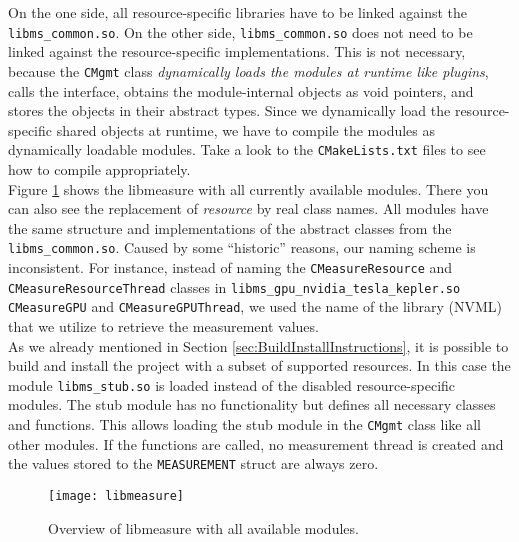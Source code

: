 On the one side, all resource-specific libraries have to be linked against the \texttt{libms\_common.so}. On the other side, \texttt{libms\_common.so} does not need to be linked against the resource-specific implementations. This is not necessary, because the \texttt{CMgmt} class \textit{dynamically loads the modules at runtime like plugins}, calls the interface, obtains the module-internal objects as void pointers, and stores the objects in their abstract types. Since we dynamically load the resource-specific shared objects at runtime, we have to compile the modules as dynamically loadable modules. Take a look to the \texttt{CMakeLists.txt} files to see how to compile appropriately.\\

Figure \ref{fig:libmeasure_overview} shows the libmeasure with all currently available modules. There you can also see the replacement of \textit{resource} by real class names. All modules have the same structure and implementations of the abstract classes from the \texttt{libms\_common.so}. Caused by some ``historic'' reasons, our naming scheme is inconsistent. For instance, instead of naming the \texttt{CMeasureResource} and \texttt{CMeasureResourceThread} classes in \texttt{libms\_gpu\_nvidia\_tesla\_kepler.so} \\\texttt{CMeasureGPU} and \texttt{CMeasureGPUThread}, we used the name of the library (NVML) that we utilize to retrieve the measurement values.\\

As we already mentioned in Section \ref{sec:BuildInstallInstructions}, it is possible to build and install the project with a subset of supported resources. In this case the module \texttt{libms\_stub.so} is loaded instead of the disabled resource-specific modules. The stub module has no functionality but defines all necessary classes and functions. This allows loading the stub module in the \texttt{CMgmt} class like all other modules. If the functions are called, no measurement thread is created and the values stored to the \texttt{MEASUREMENT} struct are always zero.

\begin{figure}
\begin{center}
\texttt{[image: libmeasure]} 
\caption{Overview of libmeasure with all available modules.}
\label{fig:libmeasure_overview}
\end{center}
\end{figure}

\pagebreak

